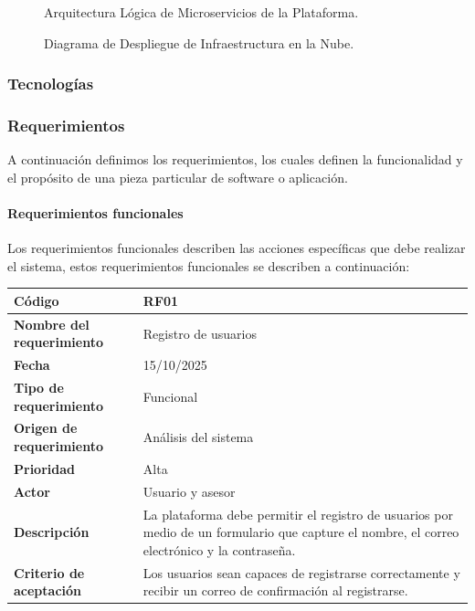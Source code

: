 \begin{figure}[H]
	\centering
	\caption{Arquitectura Lógica de Microservicios de la Plataforma.}
	\label{fig:arquitectura_logica}
\end{figure}

\begin{figure}[H]
	\centering
	\caption{Diagrama de Despliegue de Infraestructura en la Nube.}
	\label{fig:despliegue_fisico}
\end{figure}

\subsubsection*{Tecnologías}

\subsubsection*{Requerimientos}
A continuación definimos los requerimientos, los cuales definen la funcionalidad y el propósito de una pieza particular de software o aplicación.

\paragraph*{Requerimientos funcionales}
Los requerimientos funcionales describen las acciones específicas que debe realizar el sistema, estos requerimientos funcionales se describen a continuación:

\begin{table}[H]
	\begin{tabular}{|a{5cm}|m{11cm}|}
		\hline
		\textbf{Código} & RF01 \\ \hline
		\textbf{Nombre del requerimiento} & Registro de usuarios \\ \hline
		\textbf{Fecha} & 15/10/2025 \\ \hline
		\textbf{Tipo de requerimiento} & Funcional \\ \hline
		\textbf{Origen de requerimiento} & Análisis del sistema \\ \hline
		\textbf{Prioridad} & Alta \\ \hline
		\textbf{Actor} & Usuario y asesor \\ \hline
		\textbf{Descripción} & La plataforma debe permitir el registro de usuarios por medio de un formulario que capture el nombre, el correo electrónico y la contraseña. \\ \hline
		\textbf{Criterio de aceptación} & Los usuarios sean capaces de registrarse correctamente y recibir un correo de confirmación al registrarse. \\ \hline
	\end{tabular}
\end{table}

